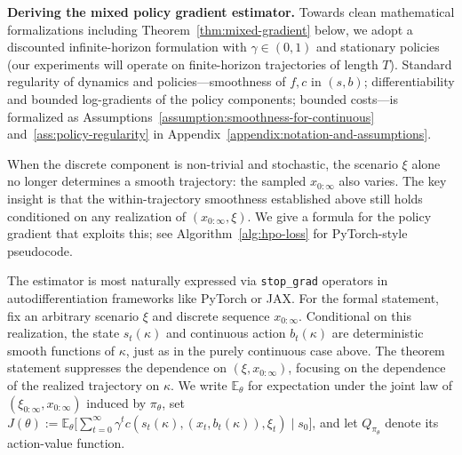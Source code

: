 \documentclass{article}
\theoremstyle{definition}
\theoremstyle{remark}
\begin{document}
{\bf Deriving the mixed policy gradient estimator.}
Towards clean mathematical formalizations including Theorem~\ref{thm:mixed-gradient} below, we adopt a discounted infinite-horizon formulation with $\gamma \in (0,1)$ and stationary policies (our experiments will operate on finite-horizon trajectories of length $T$). Standard regularity of dynamics and policies---smoothness of $f, c$ in $(s,b)$; differentiability and bounded log-gradients of the policy components; bounded costs---is formalized as Assumptions~\ref{assumption:smoothness-for-continuous} and~\ref{ass:policy-regularity} in Appendix~\ref{appendix:notation-and-assumptions}.

When the discrete component is non-trivial and stochastic, the scenario $\xi$ alone no
longer determines a smooth trajectory: the sampled $x_{0:\infty}$ also varies. The key
insight is that the within-trajectory smoothness established above still holds conditioned
on any realization of $(x_{0:\infty}, \xi)$. We give a formula for the policy gradient that
exploits this; see Algorithm~\ref{alg:hpo-loss} for PyTorch-style pseudocode.

The estimator is most naturally expressed via \texttt{stop\_grad} operators in
autodifferentiation frameworks like PyTorch or JAX. For the formal statement, fix an
arbitrary scenario $\xi$ and discrete sequence $x_{0:\infty}$. Conditional on this
realization, the state $s_t(\kappa)$ and continuous action $b_t(\kappa)$ are deterministic
smooth functions of $\kappa$, just as in the purely continuous case above. The theorem
statement suppresses the dependence on $(\xi, x_{0:\infty})$, focusing on the dependence of
the realized trajectory on $\kappa$. We write $\mathbb{E}_\theta$ for expectation under the joint law of $(\xi_{0:\infty}, x_{0:\infty})$ induced by $\pi_\theta$, set $J(\theta) := \mathbb{E}_\theta\bigl[\sum_{t=0}^{\infty}\gamma^{t} c(s_t(\kappa),(x_t,b_t(\kappa)),\xi_t)\mid s_0\bigr]$, and let $Q_{\pi_\theta}$ denote its action-value function.

 
\end{document}
